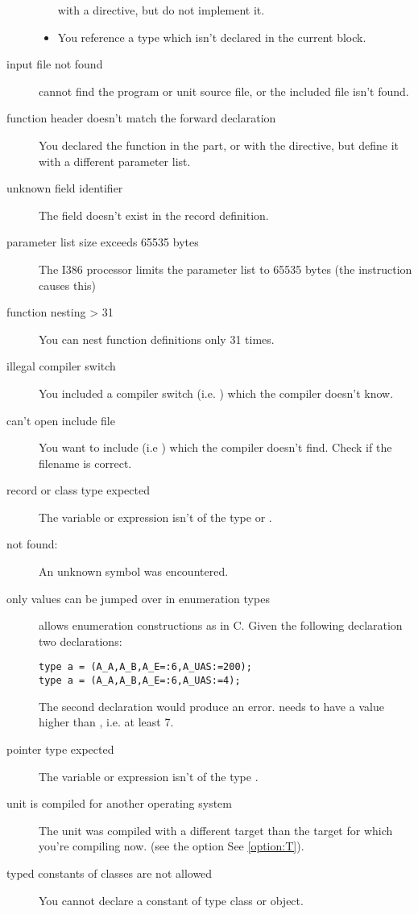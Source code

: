 \documentclass{report}
\newcommand{\seeo}[1]{See \ref{option:#1}}
\begin{document}
\begin{description}
\begin{itemize}
with a  directive, but do not implement it.
\item You reference a type which isn't declared in the current 
block.
\end{itemize}
\item [input file not found]
\fpk cannot find the program or unit source file, or the included file isn't
found.
\item [function header doesn't match the forward declaration]
You declared the function in the  part, or with the
 directive, but define it with a different parameter list. 
\item [unknown field identifier]
The field doesn't exist in the record definition.
\item [parameter list size exceeds 65535 bytes]
The I386 processor limits the parameter list to 65535 bytes (the 
instruction causes this)
\item [function nesting > 31]
You can nest function definitions only 31 times. 
\item [illegal compiler switch]
You included a compiler switch (i.e. ) which the compiler
doesn't know.
\item [can't open include file]
You want to include (i.e ) which the compiler doesn't
find. Check if the filename is correct.
\item [record or class type expected]
The variable or expression isn't of the type  or .
\item [not found:]
An unknown symbol was encountered.
\item [only values can be jumped over in enumeration types]
\fpk allows enumeration constructions as in C. Given the following
declaration two declarations:
\begin{verbatim}
type a = (A_A,A_B,A_E=:6,A_UAS:=200);
type a = (A_A,A_B,A_E=:6,A_UAS:=4);
\end{verbatim}
The second declaration would produce an error.  needs to have a
value higher than , i.e. at least 7.
\item [pointer type expected]
The variable or expression isn't of the type .
\item [unit is compiled for another operating system]
The unit was compiled with a different target than the target for which
you're compiling now. (see the option  \seeo{T}).
\item [typed constants of classes are not allowed]
You cannot declare a constant of type class or object.

\end{description}
\end{document}
